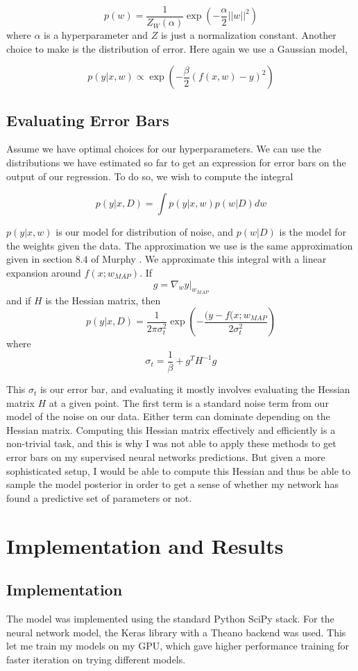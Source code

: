 \documentclass{article}
\begin{document}
\[ p(w) = \frac{1}{Z_W(\alpha)} \exp \left( -\frac{\alpha}{2} ||w||^2  \right) \]
where $\alpha$ is a hyperparameter and $Z$ is just a normalization constant.
Another choice to make is the distribution of error. Here again we use a
Gaussian model,

\[ p(y| x, w) \propto \exp\left( -\frac{\beta}{2} (f(x,w)-y)^2 \right) \]

\subsection{Evaluating Error Bars}

Assume we have optimal choices for our hyperparameters. We can
use the distributions we have estimated so far to get an expression
for error bars on the output of our regression. To do so, we wish
to compute the integral 

\[ p(y|x, D) = \int p(y|x,w) p(w|D)  dw \]

$p(y|x, w)$ is our model for distribution of noise, and $p(w|D)$ is
the model for the weights given the data. The approximation we use
is the same approximation given in section $8.4$ of Murphy \cite{murphy2012machine}.
We approximate this integral with a linear expansion around $f(x; w_{MAP})$.
If 
\[ g = \nabla_w y|_{w_{MAP}} \]
and if $H$ is the Hessian matrix, then 
\[ p(y|x, D) = \frac{1}{2\pi \sigma_t^2} \exp\left(-\frac{(y-f(x;w_{MAP}}{2\sigma_t^2} \right) \]
where
\[ \sigma_t = \frac{1}{\beta} + g^T H^{-1} g \]

This $\sigma_t$ is our error bar, and evaluating it mostly involves evaluating the
Hessian matrix $H$ at a given point. The first term is a standard noise term
from our model of the noise on our data. Either term can dominate depending
on the Hessian matrix. Computing this Hessian matrix effectively and
efficiently is a non-trivial task, and this is why I was not able to apply
these methods to get error bars on my supervised neural networks predictions. But
given a more sophisticated setup, I would be able to compute this Hessian and thus
be able to sample the model posterior in order to get a sense of whether my
network has found a predictive set of parameters or not.

\section{Implementation and Results}

\subsection{Implementation}
The model was implemented using the standard Python SciPy stack. For
the neural network model, the Keras library with a Theano backend was
used. This let me train my models on my GPU, which gave higher
performance training for faster iteration on trying different models.
\end{document}
